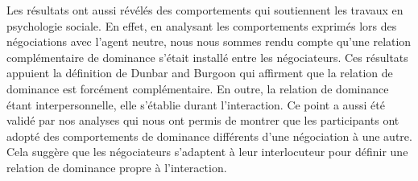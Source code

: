 	Les résultats ont aussi révélés des comportements qui soutiennent les travaux en psychologie sociale. En effet, en analysant les comportements exprimés lors des négociations avec l'agent neutre, nous nous sommes rendu compte qu'une relation complémentaire de dominance s'était installé entre les négociateurs. Ces résultats appuient la définition de Dunbar and Burgoon \cite{dunbar2005perceptions} qui affirment que la relation de dominance est forcément complémentaire. En outre, la relation de dominance étant interpersonnelle, elle s'établie durant l'interaction. Ce point a aussi été validé par nos analyses qui nous ont permis de montrer que les participants ont adopté des comportements de dominance différents d'une négociation à une autre. Cela suggère que les négociateurs s'adaptent à leur interlocuteur pour définir une relation de dominance propre à l'interaction. 